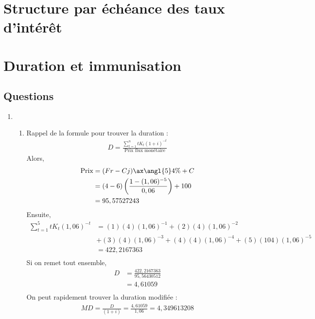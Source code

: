 \documentclass[12pt, french]{report}
\begin{document}
\chapter{Structure par échéance des taux d'intérêt}



\chapter{Duration et immunisation}
\section{Questions}


\begin{enumerate}
  \item
  \begin{enumerate}
    \item Rappel de la formule pour trouver la duration :
    \begin{align*}
      D = \frac{\sum_{t=1}^n t K_t (1+i)^{-t}}{\text{Prix flux monétaire}}
    \end{align*}
    Alors,
    \begin{align*}
      \text{Prix} & = (Fr - Cj) \ax{\angl{5} 4\%} + C \\
                  & = (4 - 6) \left( \frac{1 - (1,06)^{-5}}{0,06} \right) + 100 \\
                  & = 95,57527243 \\
      \end{align*}
    Ensuite,
    \begin{align*}
      \sum_{t=1}^5 t K_t (1,06)^{-t} & = (1)(4)(1,06)^{-1} + (2)(4)(1,06)^{-2} \\
          & + (3)(4)(1,06)^{-3} + (4)(4)(1,06)^{-4} + (5)(104)(1,06)^{-5} \\
          & = 422,2167363 \\
    \end{align*}
    Si on remet tout ensemble,
    \begin{align*}
      D   & = \frac{422,2167363}{95,56430512} \\
          & = 4,61059 \\
    \end{align*}
    On peut rapidement trouver la duration modifiée :
    \begin{align*}
      MD = \frac{D}{(1+i)} = \frac{4,61059}{1,06} = 4,349613208 \\
    \end{align*}


\end{enumerate}
\end{enumerate}
\end{document}

